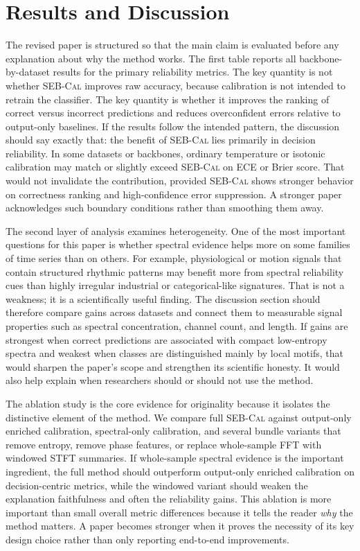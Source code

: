 \documentclass{article}
\newcommand{\method}{\textsc{SEB-Cal}}
\begin{document}
\section{Results and Discussion}
The revised paper is structured so that the main claim is evaluated before any explanation about why the method works. The first table reports all backbone-by-dataset results for the primary reliability metrics. The key quantity is not whether \method{} improves raw accuracy, because calibration is not intended to retrain the classifier. The key quantity is whether it improves the ranking of correct versus incorrect predictions and reduces overconfident errors relative to output-only baselines. If the results follow the intended pattern, the discussion should say exactly that: the benefit of \method{} lies primarily in decision reliability. In some datasets or backbones, ordinary temperature or isotonic calibration may match or slightly exceed \method{} on ECE or Brier score. That would not invalidate the contribution, provided \method{} shows stronger behavior on correctness ranking and high-confidence error suppression. A stronger paper acknowledges such boundary conditions rather than smoothing them away.

The second layer of analysis examines heterogeneity. One of the most important questions for this paper is whether spectral evidence helps more on some families of time series than on others. For example, physiological or motion signals that contain structured rhythmic patterns may benefit more from spectral reliability cues than highly irregular industrial or categorical-like signatures. That is not a weakness; it is a scientifically useful finding. The discussion section should therefore compare gains across datasets and connect them to measurable signal properties such as spectral concentration, channel count, and length. If gains are strongest when correct predictions are associated with compact low-entropy spectra and weakest when classes are distinguished mainly by local motifs, that would sharpen the paper's scope and strengthen its scientific honesty. It would also help explain when researchers should or should not use the method.

The ablation study is the core evidence for originality because it isolates the distinctive element of the method. We compare full \method{} against output-only enriched calibration, spectral-only calibration, and several bundle variants that remove entropy, remove phase features, or replace whole-sample FFT with windowed STFT summaries. If whole-sample spectral evidence is the important ingredient, the full method should outperform output-only enriched calibration on decision-centric metrics, while the windowed variant should weaken the explanation faithfulness and often the reliability gains. This ablation is more important than small overall metric differences because it tells the reader \emph{why} the method matters. A paper becomes stronger when it proves the necessity of its key design choice rather than only reporting end-to-end improvements.
\end{document}
